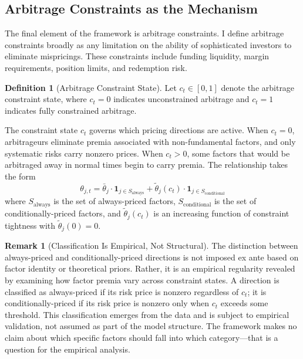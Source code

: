 \documentclass[12pt,letterpaper]{article}
\theoremstyle{plain}
\theoremstyle{definition}
\newtheorem{definition}{Definition}
\newtheorem{remark}{Remark}
\begin{document}
\subsection{Arbitrage Constraints as the Mechanism}\label{subsec:constraints}

The final element of the framework is arbitrage constraints. I define arbitrage constraints broadly as any limitation on the ability of sophisticated investors to eliminate mispricings. These constraints include funding liquidity, margin requirements, position limits, and redemption risk.

\begin{definition}[Arbitrage Constraint State]\label{def:constraint}
Let $c_t \in [0,1]$ denote the arbitrage constraint state, where $c_t = 0$ indicates unconstrained arbitrage and $c_t = 1$ indicates fully constrained arbitrage.
\end{definition}

The constraint state $c_t$ governs which pricing directions are active. When $c_t = 0$, arbitrageurs eliminate premia associated with non-fundamental factors, and only systematic risks carry nonzero prices. When $c_t > 0$, some factors that would be arbitraged away in normal times begin to carry premia. The relationship takes the form
\begin{equation}\label{eq:theta_constraint}
\theta_{j,t} = \bar{\theta}_j \cdot \mathbf{1}_{j \in S_{\text{always}}} + \tilde{\theta}_j(c_t) \cdot \mathbf{1}_{j \in S_{\text{conditional}}}
\end{equation}
where $S_{\text{always}}$ is the set of always-priced factors, $S_{\text{conditional}}$ is the set of conditionally-priced factors, and $\tilde{\theta}_j(c_t)$ is an increasing function of constraint tightness with $\tilde{\theta}_j(0) = 0$.

\begin{remark}[Classification Is Empirical, Not Structural]\label{rem:classification}
The distinction between always-priced and conditionally-priced directions is not imposed ex ante based on factor identity or theoretical priors. Rather, it is an empirical regularity revealed by examining how factor premia vary across constraint states. A direction is classified as always-priced if its risk price is nonzero regardless of $c_t$; it is conditionally-priced if its risk price is nonzero only when $c_t$ exceeds some threshold. This classification emerges from the data and is subject to empirical validation, not assumed as part of the model structure. The framework makes no claim about which specific factors should fall into which category---that is a question for the empirical analysis.
\end{remark}
\end{document}
